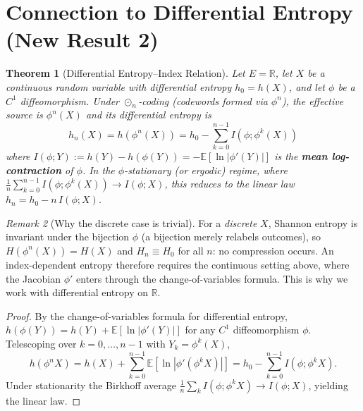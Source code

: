 \documentclass[11pt,twocolumn]{article}
\theoremstyle{plain}
\newtheorem{theorem}{Theorem}
\theoremstyle{definition}
\theoremstyle{remark}
\newtheorem{remark}[theorem]{Remark}
\newcommand{\R}{\mathbb{R}}
\begin{document}
\section{Connection to Differential Entropy (New Result 2)}
\label{sec:entropy}

\begin{theorem}[Differential Entropy--Index Relation]\label{thm:entropy-index}
Let $E = \R$, let $X$ be a \emph{continuous} random variable with differential entropy $h_0 = h(X)$, and let $\phi$ be a $C^1$ diffeomorphism. Under $\odot_n$-coding (codewords formed via $\phi^n$), the effective source is $\phi^n(X)$ and its differential entropy is
\begin{equation}
\boxed{h_n(X) = h(\phi^n(X)) = h_0 - \sum_{k=0}^{n-1} I(\phi; \phi^k(X))}
\end{equation}
where $I(\phi; Y) := h(Y) - h(\phi(Y)) = -\mathbb{E}\!\left[\ln|\phi'(Y)|\right]$ is the \textbf{mean log-contraction} of $\phi$. In the $\phi$-stationary (or ergodic) regime, where $\frac{1}{n}\sum_{k=0}^{n-1} I(\phi;\phi^k(X)) \to I(\phi;X)$, this reduces to the linear law $h_n = h_0 - n\,I(\phi;X)$.
\end{theorem}

\begin{remark}[Why the discrete case is trivial]\label{rem:discrete-trivial}
For a \emph{discrete} $X$, Shannon entropy is invariant under the bijection $\phi$ (a bijection merely relabels outcomes), so $H(\phi^n(X)) = H(X)$ and $H_n \equiv H_0$ for all $n$: no compression occurs. An index-dependent entropy therefore requires the continuous setting above, where the Jacobian $\phi'$ enters through the change-of-variables formula. This is why we work with differential entropy on $\R$.
\end{remark}

\begin{proof}
By the change-of-variables formula for differential entropy, $h(\phi(Y)) = h(Y) + \mathbb{E}[\ln|\phi'(Y)|]$ for any $C^1$ diffeomorphism $\phi$. Telescoping over $k = 0, \dots, n-1$ with $Y_k = \phi^k(X)$,
\[
h(\phi^n X) = h(X) + \sum_{k=0}^{n-1} \mathbb{E}[\ln|\phi'(\phi^k X)|] = h_0 - \sum_{k=0}^{n-1} I(\phi; \phi^k X).
\]
Under stationarity the Birkhoff average $\frac{1}{n}\sum_k I(\phi;\phi^k X) \to I(\phi;X)$, yielding the linear law.
\end{proof}
\end{document}
